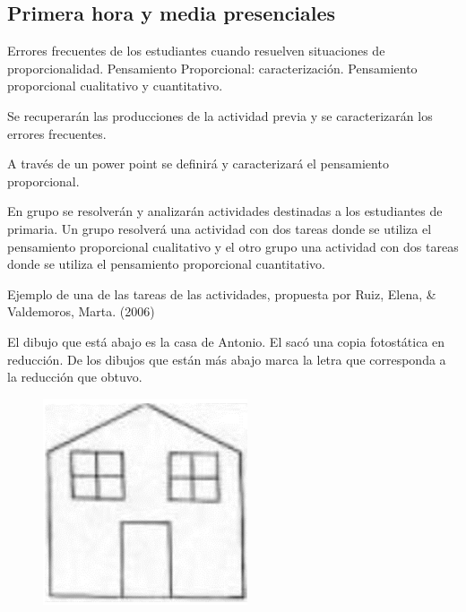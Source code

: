 \documentclass[oneside,spanish]{amsart}
\numberwithin{equation}{section}
\numberwithin{figure}{section}
\begin{document}
\subsection{Primera hora y media presenciales\label{subsec:Primera-hora-y-media-sinc}}

\begin{description}[itemsep=10pt]
    \item[Contenidos] Errores frecuentes de los estudiantes cuando resuelven situaciones de proporcionalidad. Pensamiento Proporcional: caracterización. Pensamiento proporcional cualitativo y cuantitativo.

    Se recuperarán las producciones de la actividad previa y se caracterizarán los errores frecuentes.
    
    A través de un power point se definirá y caracterizará el pensamiento proporcional.

    En grupo se resolverán y analizarán actividades destinadas a los estudiantes de primaria. Un grupo resolverá una actividad con dos tareas  donde se utiliza el pensamiento proporcional cualitativo y el otro grupo una  actividad con dos tareas donde se utiliza el pensamiento proporcional cuantitativo.

    Ejemplo de una de las tareas de las actividades, propuesta por Ruiz, Elena, \& Valdemoros, Marta. (2006)

    El dibujo que está abajo es la casa de Antonio. El sacó una copia fotostática en reducción. De los dibujos que están más abajo marca la letra que corresponda a la reducción que obtuvo.

    \begin{figure}[h]
        \centering
        \includegraphics{imagenes/casa1.png}
        \label{fig:casa1}
    \end{figure}
    

\end{description}
\end{document}
